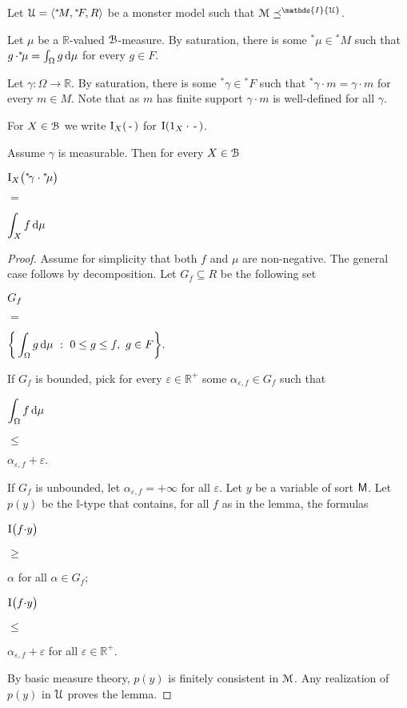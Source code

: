 \documentclass[11pt,oneside]{amsart}
\begin{document}
Let ${\EuScript U}=\langle {}^*\!M,{}^*\!F,R\rangle$ be a monster model such that ${\EuScript M}\preceq^\mathds{I}{\EuScript U}$.

\def\ceq#1#2#3{\parbox[t]{25ex}{$\displaystyle #1$}\parbox{5ex}{\hfil $#2$}{$\displaystyle #3$}}

Let $\mu$ be a $\mathds{R}$-valued ${\EuScript B}$-measure.
By saturation, there is some ${}^*\!\mu\in{}^*\!M$ such that $g\,{\cdot}{}^*\!\mu=\int_\Omega g\,{\rm d}\mu$ for every $g\in F$.

 Let $\gamma:\Omega\to\mathds{R}$. 
 By saturation, there is some ${}^*\!\gamma\in{}^*\!F$ such that ${}^*\!\gamma\mathbin\cdot m=\gamma\mathbin\cdot m$ for every $m\in M$. 
 Note that as $m$ has finite support $\gamma\mathbin\cdot m$ is well-defined for all $\gamma$.

 For $X\in{\EuScript B}$ we write ${\rm I}_X(\,\mbox{-}\,)$ for ${\rm I}(1_X\cdot\,\mbox{-}\,)$.

\begin{lemma}
  Assume $\gamma$ is measurable.
  Then for every $X\in{\EuScript B}$

  \ceq{\hfill {\rm I}_X\big({}^*\!\gamma\cdot{}^*\!\mu\big)}{=}{\int_X f\,{\rm d}\mu}
  
  
\end{lemma}

\begin{proof}
  Assume for simplicity that both $f$ and $\mu$ are non-negative.
  The general case follows by decomposition.
  Let $G_f\subseteq R$ be the following set

  \ceq{\hfill G_f}{=} {\bigg\{\int_\Omega g\,{\rm d}\mu\ :\ 0\le g\le f,\ g\in F\bigg\}.}

  If $G_f$ is bounded, pick for every $\varepsilon\in\mathds{R}^+$ some $\alpha_{\varepsilon,f}\in G_f$ such that 

  \ceq{\hfill\int_\Omega f\,{\rm d}\mu}{\le}{\alpha_{\varepsilon,f}+\varepsilon.}
 
  If $G_f$ is unbounded, let $\alpha_{\varepsilon,f}=+\infty$ for all $\varepsilon$.
  Let $y$ be a variable of sort ${\sf M}$.
  Let $p(y)$ be the $\mathds{I}$-type that contains, for all $f$ as in the lemma, the formulas 

  \ceq{\hfill{\rm I}\big( f{\cdot} y\big)}{\ge}{\alpha}
  \hfill for all $\alpha\in G_f$;

  \ceq{\hfill{\rm I}\big( f{\cdot} y\big)}{\le}{\alpha_{\varepsilon,f}+\varepsilon}
  \hfill for all $\varepsilon\in\mathds{R}^+$\cdot.

  By basic measure theory, $p(y)$ is finitely consistent in ${\EuScript M}$.
  Any realization of $p(y)$ in ${\EuScript U}$ proves the lemma.
\end{proof}
\end{document}
